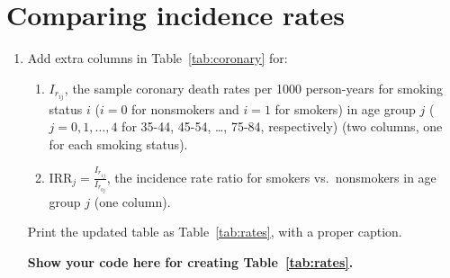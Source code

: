 \documentclass[a4paper,10pt]{article}\usepackage[]{graphicx}\usepackage[]{xcolor}
\begin{document}
\section{Comparing incidence rates}
\label{sec:section2}
\begin{enumerate}
    \item Add extra columns in Table~\ref{tab:coronary} for:
    \begin{enumerate}
        \item $I_{r_{ij}}$, the sample coronary death rates per 1000 person-years for smoking status $i$ ($i = 0$ for nonsmokers and $i = 1$ for smokers) in age group $j$ ($j = 0, 1, \dots, 4$ for 35-44, 45-54, \dots, 75-84, respectively) (two columns, one for each smoking status).
    
        \item $\text{IRR}_j = \frac{I_{r_{1j}}}{I_{r_{0j}}}$, the incidence rate ratio for smokers vs.\ nonsmokers in age group $j$ (one column).
    \end{enumerate}
    
    Print the updated table as Table~\ref{tab:rates}, with a proper caption.
    
    \textbf{Show your code here for creating Table~\ref{tab:rates}.}
    

\end{enumerate}
\end{document}
